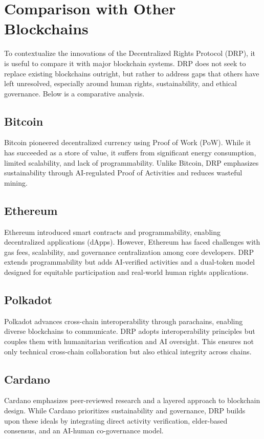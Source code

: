 \documentclass[11pt,a4paper]{article}
\begin{document}
\section{Comparison with Other Blockchains}

To contextualize the innovations of the Decentralized Rights Protocol (DRP), it is useful to compare it with major blockchain systems. DRP does not seek to replace existing blockchains outright, but rather to address gaps that others have left unresolved, especially around human rights, sustainability, and ethical governance. Below is a comparative analysis.

\subsection{Bitcoin}
Bitcoin pioneered decentralized currency using Proof of Work (PoW). While it has succeeded as a store of value, it suffers from significant energy consumption, limited scalability, and lack of programmability. Unlike Bitcoin, DRP emphasizes sustainability through AI-regulated Proof of Activities and reduces wasteful mining.

\subsection{Ethereum}
Ethereum introduced smart contracts and programmability, enabling decentralized applications (dApps). However, Ethereum has faced challenges with gas fees, scalability, and governance centralization among core developers. DRP extends programmability but adds AI-verified activities and a dual-token model designed for equitable participation and real-world human rights applications.

\subsection{Polkadot}
Polkadot advances cross-chain interoperability through parachains, enabling diverse blockchains to communicate. DRP adopts interoperability principles but couples them with humanitarian verification and AI oversight. This ensures not only technical cross-chain collaboration but also ethical integrity across chains.

\subsection{Cardano}
Cardano emphasizes peer-reviewed research and a layered approach to blockchain design. While Cardano prioritizes sustainability and governance, DRP builds upon these ideals by integrating direct activity verification, elder-based consensus, and an AI-human co-governance model.
\end{document}
